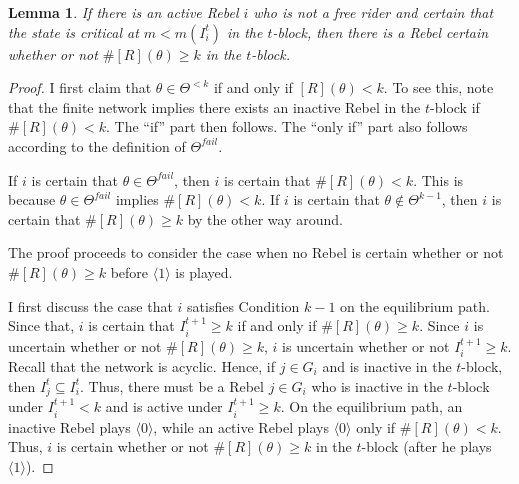 \documentclass[12pt,letter]{article}
\newtheorem{lemma}{Lemma}[section]
\theoremstyle{definition}
\theoremstyle{definition}
\theoremstyle{remark}
\theoremstyle{claim}
\begin{document}
\begin{lemma} If there is an active Rebel $i$ who is not a free rider and certain that the state is critical at $m<m(I^t_i)$ in the $t$-block, then there is a Rebel certain whether or not $\#[R](\theta)\geq k$ in the $t$-block.

\end{lemma}
\begin{proof}
I first claim that $\theta\in \Theta^{<k}$ if and only if $[R](\theta)<k$. To see this, note that the finite network implies there exists an inactive Rebel in the $t$-block if $\#[R](\theta)<k$. The ``if'' part then follows. The ``only if'' part also follows according to the definition of $\Theta^{fail}$.

If $i$ is certain that $\theta\in \Theta^{fail}$, then $i$ is certain that $\#[R](\theta)<k$. This is because $\theta\in \Theta^{fail}$ implies $\#[R](\theta)<k$. If $i$ is certain that $\theta\notin \Theta^{k-1}$, then $i$ is certain that $\#[R](\theta)\geq k$ by the other way around.

The proof proceeds to consider the case when no Rebel is certain whether or not $\#[R](\theta)\geq k$ before $\langle 1 \rangle$ is played. 

I first discuss the case that $i$ satisfies Condition $k-1$ on the equilibrium path. Since that, $i$ is certain that $I^{t+1}_i\geq k$ if and only if $\#[R](\theta)\geq k$. Since $i$ is uncertain whether or not $\#[R](\theta)\geq k$, $i$ is uncertain whether or not $I^{t+1}_i\geq k$. Recall that the network is acyclic. Hence, if $j\in G_i$ and is inactive in the $t$-block, then $I^t_j\subseteq I^t_i$. Thus, there must be a Rebel $j\in G_i$ who is inactive in the $t$-block under $I^{t+1}_i<k$ and is active under $I^{t+1}_i\geq k$. On the equilibrium path, an inactive Rebel plays $\langle 0 \rangle$, while an active Rebel plays $\langle 0 \rangle$ only if $\#[R](\theta)<k$. Thus, $i$ is certain whether or not $\#[R](\theta)\geq k$ in the $t$-block (after he plays $\langle 1 \rangle$).     


\end{proof}
\end{document}
